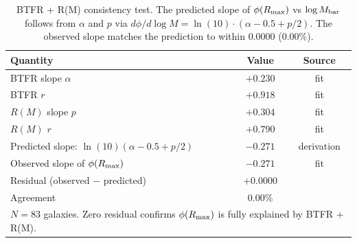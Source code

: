 \begin{table}[htbp]
\centering
\caption{BTFR + R(M) consistency test. The predicted slope of
         $\phi(R_{\rm max})$ vs $\log M_{\rm bar}$ follows from
         $\alpha$ and $p$ via $d\phi/d\log M = \ln(10)\cdot(\alpha - 0.5 + p/2)$.
         The observed slope matches the prediction to within
         $0.0000$ ($0.00\%$).}
\label{tab:btfr_consistency}
\begin{tabular}{lcc}
\hline
Quantity & Value & Source \\
\hline
BTFR slope $\alpha$ & $+0.230$ & fit \\
BTFR $r$ & $+0.918$ & fit \\
$R(M)$ slope $p$ & $+0.304$ & fit \\
$R(M)$ $r$ & $+0.790$ & fit \\
Predicted slope: $\ln(10)(\alpha - 0.5 + p/2)$ & $-0.271$ & derivation \\
Observed slope of $\phi(R_{\rm max})$ & $-0.271$ & fit \\
Residual (observed $-$ predicted) & $+0.0000$ & \\
Agreement & $0.00\%$ & \\
\hline
\multicolumn{3}{l}{\footnotesize $N = 83$ galaxies. Zero residual confirms $\phi(R_{\rm max})$ is fully explained by BTFR + R(M).} \\
\end{tabular}
\end{table}
